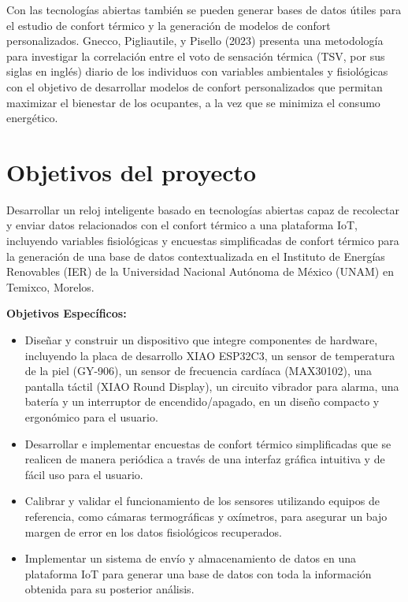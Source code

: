 \documentclass[
  12pt,
  letterpaper,
  DIV=11,
  numbers=noendperiod]{scrreport}
\begin{document}
Con las tecnologías abiertas también se pueden generar bases de datos
útiles para el estudio de confort térmico y la generación de modelos de
confort personalizados. Gnecco, Pigliautile, y Pisello (2023) presenta
una metodología para investigar la correlación entre el voto de
sensación térmica (TSV, por sus siglas en inglés) diario de los
individuos con variables ambientales y fisiológicas con el objetivo de
desarrollar modelos de confort personalizados que permitan maximizar el
bienestar de los ocupantes, a la vez que se minimiza el consumo
energético.

\hypertarget{objetivos-del-proyecto}{%
\section{Objetivos del proyecto}\label{objetivos-del-proyecto}}

Desarrollar un reloj inteligente basado en tecnologías abiertas capaz de
recolectar y enviar datos relacionados con el confort térmico a una
plataforma IoT, incluyendo variables fisiológicas y encuestas
simplificadas de confort térmico para la generación de una base de datos
contextualizada en el Instituto de Energías Renovables (IER) de la
Universidad Nacional Autónoma de México (UNAM) en Temixco, Morelos.

\textbf{Objetivos Específicos:}

\begin{itemize}
\item
  Diseñar y construir un dispositivo que integre componentes de
  hardware, incluyendo la placa de desarrollo XIAO ESP32C3, un sensor de
  temperatura de la piel (GY-906), un sensor de frecuencia cardíaca
  (MAX30102), una pantalla táctil (XIAO Round Display), un circuito
  vibrador para alarma, una batería y un interruptor de
  encendido/apagado, en un diseño compacto y ergonómico para el usuario.
\item
  Desarrollar e implementar encuestas de confort térmico simplificadas
  que se realicen de manera periódica a través de una interfaz gráfica
  intuitiva y de fácil uso para el usuario.
\item
  Calibrar y validar el funcionamiento de los sensores utilizando
  equipos de referencia, como cámaras termográficas y oxímetros, para
  asegurar un bajo margen de error en los datos fisiológicos
  recuperados.
\item
  Implementar un sistema de envío y almacenamiento de datos en una
  plataforma IoT para generar una base de datos con toda la información
  obtenida para su posterior análisis.
\end{itemize}
\end{document}
